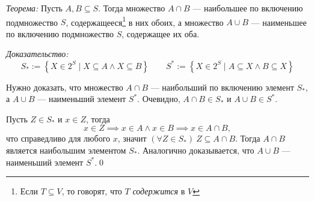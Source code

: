 \pagebreak
{\it Теорема:} Пусть $A,B\subseteq S$. Тогда множество $A\cap B$ ---
наибольшее по включению подмножество $S$, содержащееся\footnote{Если $T\subseteq V$,
	то говорят, что $T$ {\it содержится}
	в $V$} в них обоих,
а множество $A\cup B$ --- наименьшее по включению подмножество $S$,
содержащее их оба.

{\it Доказательство:}
\[
	S_{*}:=\left\{X\in 2^{S}\;\big|\; X\subseteq A\land X\subseteq B\right\}\qquad
	S^{*}:=\left\{X\in 2^{S}\;\big|\; A\subseteq X\land B\subseteq X\right\}
\]

Нужно доказать, что множество $A\cap B$ --- наибольший по включению элемент $S_{*}$,
а $A\cup B$ --- наименьший элемент $S^{*}$.
Очевидно, $A\cap B\in S_{*}$ и $A\cup B\in S^{*}$.

Пусть $Z\in S_{*}$ и $x\in Z$, тогда
\[
	x\in Z\implies x\in A\land x\in B\implies x\in A\cap B,
\]
что справедливо для любого $x$,
значит ${(\forall Z\in S_{*})~Z\subseteq A\cap B}$. Тогда
$A\cap B$ является наибольшим элементом $S_{*}$.
Аналогично доказывается, что $A\cup B$ --- наименьший элемент $S^{*}$.\qed


